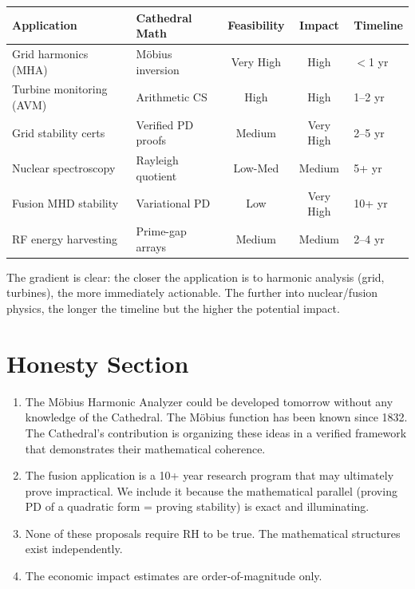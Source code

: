 \documentclass[11pt,a4paper]{article}
\newcommand{\RH}{\ensuremath{\mathrm{RH}}}
\begin{document}
\begin{center}
\small
\begin{tabular}{@{}llccl@{}}
\toprule
\textbf{Application} & \textbf{Cathedral Math} &
\textbf{Feasibility} & \textbf{Impact} & \textbf{Timeline} \\
\midrule
Grid harmonics (MHA) & M\"obius inversion & Very High & High & $<$1 yr \\
Turbine monitoring (AVM) & Arithmetic CS & High & High & 1--2 yr \\
Grid stability certs & Verified PD proofs & Medium & Very High & 2--5 yr \\
Nuclear spectroscopy & Rayleigh quotient & Low-Med & Medium & 5+ yr \\
Fusion MHD stability & Variational PD & Low & Very High & 10+ yr \\
RF energy harvesting & Prime-gap arrays & Medium & Medium & 2--4 yr \\
\bottomrule
\end{tabular}
\end{center}

The gradient is clear: the closer the application is to harmonic
analysis (grid, turbines), the more immediately actionable. The
further into nuclear/fusion physics, the longer the timeline but
the higher the potential impact.

\section{Honesty Section}

\begin{enumerate}
  \item The M\"obius Harmonic Analyzer could be developed tomorrow
    without any knowledge of the Cathedral. The M\"obius function
    has been known since 1832. The Cathedral's contribution is
    organizing these ideas in a verified framework that demonstrates
    their mathematical coherence.
  \item The fusion application is a 10+ year research program that
    may ultimately prove impractical. We include it because the
    mathematical parallel (proving PD of a quadratic form = proving
    stability) is exact and illuminating.
  \item None of these proposals require \RH{} to be true. The
    mathematical structures exist independently.
  \item The economic impact estimates are order-of-magnitude only.
\end{enumerate}
\end{document}
